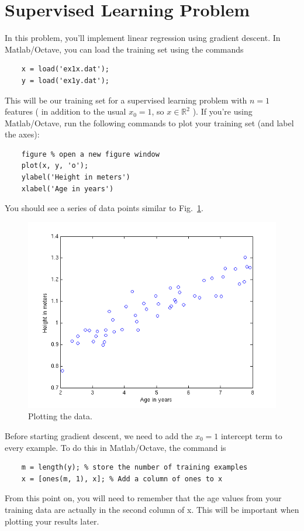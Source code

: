\documentclass[10pt,a4paper]{article}
\begin{document}
\section{Supervised Learning Problem}
%
  In this problem, you'll implement linear regression using gradient descent. In Matlab/Octave, you can load the training set using the commands
  \begin{lstlisting}
    x = load('ex1x.dat');
    y = load('ex1y.dat');
  \end{lstlisting}
  This will be our training set for a supervised learning problem with $n=1$ features ( in addition to the usual  $x_0 = 1$, so  $x \in {\mathbb R}^2$ ). If you're using Matlab/Octave, run the following commands to plot your training set (and label the axes):
  \begin{lstlisting}
    figure % open a new figure window
    plot(x, y, 'o');
    ylabel('Height in meters')
    xlabel('Age in years')
  \end{lstlisting}
  You should see a series of data points similar to Fig.~\ref{fig:data}.
  \begin{figure}[h!]
    \centering
      \includegraphics[width=.6\columnwidth]{ex2dataonly}
      \caption{Plotting the data.}
      \label{fig:data}
  \end{figure}

  Before starting gradient descent, we need to add the $x_0 = 1$ intercept term to every example. To do this in Matlab/Octave, the command is
  \begin{lstlisting}
    m = length(y); % store the number of training examples
    x = [ones(m, 1), x]; % Add a column of ones to x
  \end{lstlisting}
  From this point on, you will need to remember that the age values from your training data are actually in the second column of x. This will be important when plotting your results later.
\end{document}
